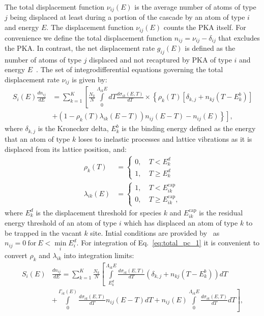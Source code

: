 \documentclass[review]{elsarticle}
\begin{document}
The total displacement function $\nu_{ij}(E)$ is the average number of atoms of type $j$ being displaced at least during a portion of the cascade by an atom of type $i$ and energy $E$. The displacement function $\nu_{ij}(E)$ counts the PKA itself. For convenience we define the total displacement function $n_{ij} = \nu_{ij} - \delta_{ij}$ that excludes the PKA. In contrast, the net displacement rate $g_{ij}(E)$ is defined as the number of atoms of type $j$ displaced and not recaptured by PKA of type $i$ and energy $E$~\cite{PC1981}. The set of integrodifferential equations governing the total displacement rate $\nu_{ij}$ is given by:
\begin{align}\label{eq:total_pc_1}
  S_{i}(E) \frac{d n_{ij}}{dE}  &= \sum\limits_{k=1}^K   \left[ \frac{N_k}{N} \int\limits_{0}^{\Lambda_{ik}E} dT \frac{d \sigma_{ik} (E,T)}{dT} \right . 
  \times \left \{   \rho_k(T) \left[  \delta_{k,j} + n_{kj}(T-E_k^b) \right] \right .
  \nonumber \\
  &+ \left . \left .  \left( 1 - \rho_k(T) \lambda_{ik}(E-T) \right)n_{ij}(E-T)  -n_{ij}(E)\right \} \right],
\end{align}
 where $\delta_{k,j}$ is the Kronecker delta, $E_k^b$ is the binding energy defined as the energy that an atom of type $k$ loses to inelastic processes and lattice vibrations as it is displaced from its lattice position, and:
\begin{align}
 \rho_k(T) &= \left\{ \begin{array}{ll}
         0, & ~ T < E_k^d\\
         1, & ~ T \ge E_k^d \end{array} \right.  \nonumber \\
 \lambda_{ik}(E) &=  \left\{ \begin{array}{ll}
         1, & ~ T < E_{ik}^{\text{cap}}\\
         0, & ~ T \ge E_{ik}^{\text{cap}} ,\end{array} \right.  
\end{align} 
where $E_k^d$ is the displacement threshold for species $k$ and $E_{ik}^{\text{cap}}$ is the residual energy threshold of an atom of type $i$ which has displaced an atom of type $k$ to be trapped in the vacant $k$ site. Intial conditions are provided by~\cite{PC1981} as $n_{ij} = 0 ~\text{for} ~E < \min\limits_{i} E_i^d$. For integration of Eq.~\ref{eq:total_pc_1} it is convenient to convert $\rho_k$ and $\lambda_{ik}$ into integration limits:
\begin{align}\label{eq:total_pc_2}
  S_{i}(E) &\frac{d n_{ij}}{dE}  = \sum\limits_{k=1}^K \frac{N_k}{N}   \left[ \int\limits_{E_k^d}^{\Lambda_{ik}E}  \frac{d \sigma_{ik} (E,T)}{dT}
  \left(  \delta_{k,j} + n_{kj}(T-E_k^b) \right) dT
    \right . \nonumber \\
    & \left . +\int\limits_{0}^{\Gamma_{ik}(E)}  \frac{d \sigma_{ik} (E,T)}{dT}  n_{ij}(E-T) dT +n_{ij}(E) \int\limits_{0}^{\Lambda_{ik}E}  \frac{d \sigma_{ik} (E,T)}{dT}   dT \right ] ,
\end{align}
\end{document}

